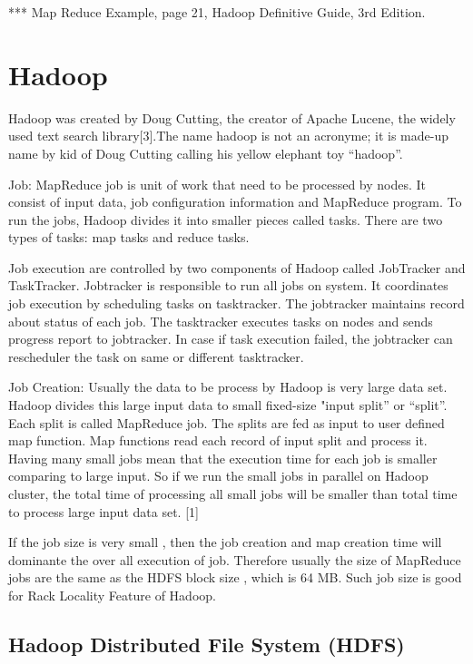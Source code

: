 *** Map Reduce Example, page 21, Hadoop Definitive Guide, 3rd Edition.


\section{ Hadoop}

Hadoop was created by Doug Cutting, the creator of Apache Lucene, the widely used text search library[3].The name hadoop is not an acronyme; it is made-up name by kid of Doug Cutting calling his yellow elephant toy “hadoop”.


Job: MapReduce job is unit of work that need to be processed by nodes. It consist of input data, job configuration information and MapReduce program. To run the jobs, Hadoop divides it into smaller pieces called tasks. There are two types of tasks: map tasks and reduce tasks.

Job execution are controlled by two components of Hadoop called JobTracker and TaskTracker. Jobtracker is responsible to run all jobs on system. It coordinates job execution by scheduling tasks on tasktracker. The jobtracker maintains record about status of each job. The tasktracker executes tasks on nodes and sends progress report to jobtracker. In case if task execution failed, the jobtracker can rescheduler the task on same or different tasktracker.  

Job Creation: Usually the data to be process by Hadoop is very large data set. Hadoop divides this large input data to small fixed-size "input split” or “split”. Each split is called MapReduce job. The splits are fed as input to user defined map function. Map functions read each record of input split and process it. Having many small jobs mean that the execution time for each job is smaller comparing to large input. So if we run the small jobs in parallel on Hadoop cluster, the total time of processing all small jobs will be smaller than total time to process large input data set. [1]

If the job size is very small , then the job creation and map creation time will dominante the over all execution of job. Therefore usually the size of MapReduce jobs are the same as the HDFS block size , which is 64 MB. Such job size is good for Rack Locality Feature of Hadoop.


\subsection{Hadoop Distributed File System (HDFS)}

